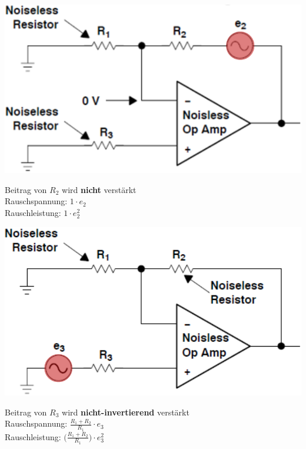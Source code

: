 \begin{minipage}[c]{0.4\columnwidth}
    \includegraphics[width=\columnwidth]{images/rauschen_opamp_R2.png}
\end{minipage}
\hfill
\begin{minipage}[c]{0.4\columnwidth}
    Beitrag von $R_2$ wird \textbf{nicht} verstärkt \\

    Rauschspannung: $ 1 \cdot e_2$ \\
    Rauschleistung: $ 1 \cdot e_2^2$
\end{minipage}


\begin{minipage}[c]{0.4\columnwidth}
    \includegraphics[width=\columnwidth]{images/rauschen_opamp_R3.png}
\end{minipage}
\hfill
\begin{minipage}[c]{0.4\columnwidth}
    Beitrag von $R_3$ wird \textbf{nicht-invertierend} verstärkt \\

    Rauschspannung: $ \frac{R_1 + R_2}{R_1} \cdot e_3$ \\
    Rauschleistung: $ \bigl(\frac{R_1 + R_2}{R_1} \bigr) \cdot e_3^2$
\end{minipage}


